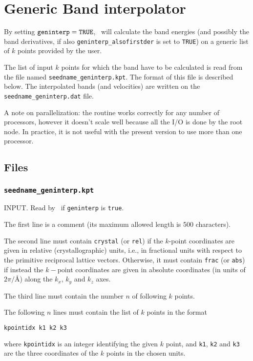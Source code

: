 \chapter{Generic Band interpolator}\label{ch:geninterp}

By setting $\verb#geninterp#=\verb#TRUE#$, \postw\ will calculate the
band energies (and possibly the band derivatives, if also
\verb#geninterp_alsofirstder# is set to \verb#TRUE#) on a generic list
of $k$ points provided by the user.

The list of input $k$ points for which the band have to be calculated
is read from the file named {\tt seedname\_geninterp.kpt}. The format
of this file is
described below. The interpolated bands (and velocities) are written on the {\tt
  seedname\_geninterp.dat} file.

A note on parallelization: the routine works correctly for any number of processors,
however it doesn't scale well because all the I/O is done by the root node. In practice,
it is not useful with the present version to use more than one processor.

\section{Files}
\subsection{{\tt seedname\_geninterp.kpt}}
INPUT. Read by \postw\ if {\tt geninterp} is \verb#true#. 

The first line is a comment (its maximum allowed length is 500
characters).

The second line must contain \verb#crystal# (or \verb#rel#) if the
$k$-point coordinates are given in relative (crystallographic) units,
i.e., in fractional units with respect to the primitive reciprocal
lattice vectors.
Otherwise, it must contain \verb#frac# (or \verb#abs#) if instead the
$k-$point coordinates are given in absolute 
coordinates (in units of $2\pi/$\AA) along the $k_x$, $k_y$ and $k_z$
axes.

The third line must contain the number $n$ of following $k$ points.

The following $n$ lines must contain the list of $k$ points in the
format
\begin{verbatim}
kpointidx k1 k2 k3
\end{verbatim}
where \verb#kpointidx# is an integer identifying the given $k$ point,
and \verb#k1#, \verb#k2# and \verb#k3# are the three coordinates of the
$k$ points in the chosen units.


